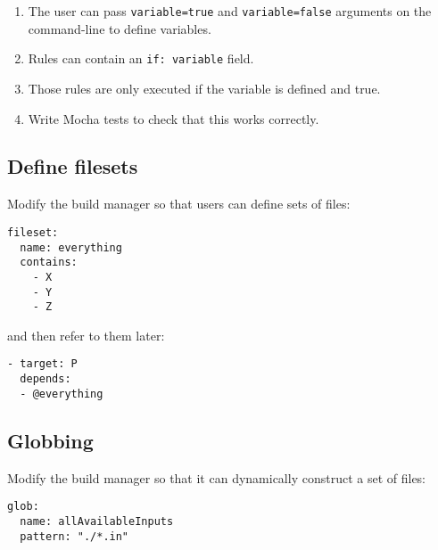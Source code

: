 \documentclass[krantzl]{krantz}
\begin{document}
\begin{enumerate}

\item 

The user can pass \texttt{variable=true} and \texttt{variable=false} arguments on the command-line
    to define variables.



\item 

Rules can contain an \texttt{if: variable} field.



\item 

Those rules are only executed if the variable is defined and true.



\item 

Write Mocha tests to check that this works correctly.



\end{enumerate}

\subsection*{Define filesets}


Modify the build manager so that users can define sets of files:

\begin{lstlisting}[frame=tblr]
fileset:
  name: everything
  contains:
    - X
    - Y
    - Z
\end{lstlisting}


\noindent and then refer to them later:

\begin{lstlisting}[frame=tblr]
- target: P
  depends:
  - @everything
\end{lstlisting}

\subsection*{Globbing}


Modify the build manager so that it can dynamically construct a set of files:

\begin{lstlisting}[frame=tblr]
glob:
  name: allAvailableInputs
  pattern: "./*.in"
\end{lstlisting}
\end{document}

